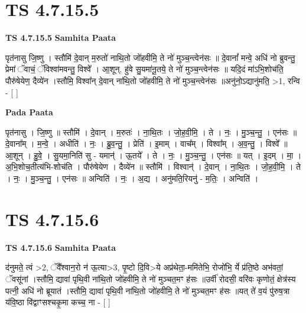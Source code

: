 \documentclass[17pt]{extarticle}
\begin{document}

\section{ TS 4.7.15.5 }

\textbf{TS 4.7.15.5 } \newline
\textbf{Samhita Paata} \newline

पृत॑नासु जि॒ष्णु । स्तौमि॑ दे॒वान् म॒रुतो॑ नाथि॒तो जो॑हवीमि॒ ते नो॑ मुञ्च॒न्त्वेन॑सः ॥ दे॒वानां᳚ मन्वे॒ अधि॑ नो ब्रुवन्तु॒ प्रेमां ॅवाचं॒ ॅविश्वा॑मवन्तु॒ विश्वे᳚ । आ॒शून्. हु॑वे सु॒यमा॑नू॒तये॒ ते नो॑ मुञ्च॒न्त्वेन॑सः ॥ यदि॒दं मा॑ऽभि॒शोच॑ति॒ पौरु॑षेयेण॒ दैव्ये॑न ।स्तौमि॒ विश्वा᳚न् दे॒वान् ना॑थि॒तो जो॑हवीमि॒ ते नो॑ मुञ्च॒न्त्वेन॑सः ॥अनु॑नो॒ऽद्यानु॑मति॒ >1, रन्वि - [  ] \newline

\textbf{Pada Paata} \newline

पृत॑नासु । जि॒ष्णु ॥ स्तौमि॑ । दे॒वान् । म॒रुतः॑ । ना॒थि॒तः । जो॒ह॒वी॒मि॒ । ते । नः॒ । मु॒ञ्च॒न्तु॒ । एन॑सः ॥ दे॒वाना᳚म् । म॒न्वे॒ । अधीति॑ । नः॒ । ब्रु॒व॒न्तु॒ । प्रेति॑ । इ॒माम् । वाच᳚म् । विश्वा᳚म् । अ॒व॒न्तु॒ । विश्वे᳚ ॥ आ॒शून् । हु॒वे॒ । सु॒यमा॒निति॑ सु - यमान्॑ । ऊ॒तये᳚ । ते । नः॒ । मु॒ञ्च॒न्तु॒ । एन॑सः ॥ यत् । इ॒दम् । मा॒ । अ॒भि॒शोच॒तीत्य॑भि-शोच॑ति । पौरु॑षेयेण । दैव्ये॑न ॥ स्तौमि॑ । विश्वान्॑ । दे॒वान् । ना॒थि॒तः । जो॒ह॒वी॒मि॒ । ते । नः॒ । मु॒ञ्च॒न्तु॒ । एन॑सः ॥ अन्विति॑ । नः॒ । अ॒द्य । अनु॑मति॒रियनु॑ - म॒तिः॒ । अन्विति॑ ।  \newline





\section{ TS 4.7.15.6 }

\textbf{TS 4.7.15.6 } \newline
\textbf{Samhita Paata} \newline

द॑नुमते॒ त्वं >2, ॅवै᳚श्वान॒रो न॑ ऊ॒त्या>3, पृ॒ष्टो दि॒वि>ये अप्र॑थेता॒-ममि॑तेभि॒ रोजो॑भि॒ र्ये प्र॑ति॒ष्ठे अभ॑वतां॒ ॅवसू॑नां ।स्तौमि॒ द्यावा॑ पृथि॒वी ना॑थि॒तो जो॑हवीमि॒ ते नो॑ मुञ्चत॒मꣳ ह॑सः ॥उर्वी॑ रोदसी॒ वरि॑वः कृणोतं॒ क्षेत्र॑स्य पत्नी॒ अधि॑ नो ब्रूयातं ।स्तौमि॒ द्यावा॑ पृथि॒वी ना॑थि॒तो जो॑हवीमि॒ ते नो॑ मुञ्चत॒मꣳ ह॑सः ॥यत् ते॑ व॒यं पु॑रुष॒त्रा य॑वि॒ष्ठा वि॑द्वाꣳसश्चकृ॒मा कच्च॒ ना - [  ] \newline
\end{document}
